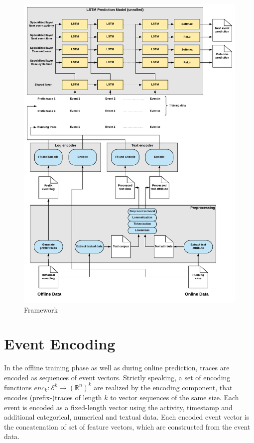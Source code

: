 \begin{figure}
	\includegraphics[width=\textwidth]{figures/framework}
	\caption{Framework}
	\label{fig:framework}
\end{figure}


\section{Event Encoding}

In the offline training phase as well as during online prediction, traces are encoded as sequences of event vectors.
Strictly speaking, a set of encoding functions  $enc_k \colon \mathcal{E}^k \to (\mathbb{R}^n)^k$ are realized by the encoding component, that encodes (prefix-)traces of length $k$ to vector sequences of the same size.
Each event is encoded as a fixed-length vector using the activity, timestamp and additional categorical, numerical and textual data.
Each encoded event vector is the concatenation of set of feature vectors, which are constructed from the event data.

